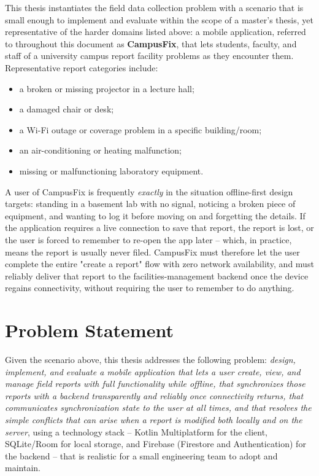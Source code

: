 This thesis instantiates the field data collection problem with a scenario
that is small enough to implement and evaluate within the scope of a
master's thesis, yet representative of the harder domains listed above: a
mobile application, referred to throughout this document as
\textbf{CampusFix}, that lets students, faculty, and staff of a university
campus report facility problems as they encounter them. Representative
report categories include:

\begin{itemize}
  \item a broken or missing projector in a lecture hall;
  \item a damaged chair or desk;
  \item a Wi-Fi outage or coverage problem in a specific building/room;
  \item an air-conditioning or heating malfunction;
  \item missing or malfunctioning laboratory equipment.
\end{itemize}

A user of CampusFix is frequently \emph{exactly} in the situation
offline-first design targets: standing in a basement lab with no signal,
noticing a broken piece of equipment, and wanting to log it before moving
on and forgetting the details. If the application requires a live
connection to save that report, the report is lost, or the user is forced
to remember to re-open the app later -- which, in practice, means the
report is usually never filed. CampusFix must therefore let the user
complete the entire "create a report" flow with zero network availability,
and must reliably deliver that report to the facilities-management backend
once the device regains connectivity, without requiring the user to
remember to do anything.

\section{Problem Statement}
\label{sec:problem-statement}

Given the scenario above, this thesis addresses the following problem:
\emph{design, implement, and evaluate a mobile application that lets a user
create, view, and manage field reports with full functionality while
offline, that synchronizes those reports with a backend transparently and
reliably once connectivity returns, that communicates synchronization state
to the user at all times, and that resolves the simple conflicts that can
arise when a report is modified both locally and on the server}, using a
technology stack -- Kotlin Multiplatform for the client, SQLite/Room for
local storage, and Firebase (Firestore and Authentication) for the backend
-- that is realistic for a small engineering team to adopt and maintain.

